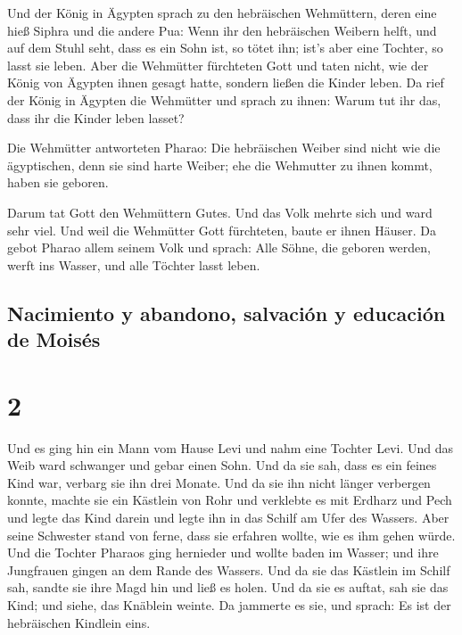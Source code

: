  Und der König in Ägypten sprach zu den hebräischen
Wehmüttern, deren eine hieß Siphra und die andere Pua: 
Wenn ihr den hebräischen Weibern helft, und auf dem Stuhl seht, dass es
ein Sohn ist, so tötet ihn; ist's aber eine Tochter, so lasst sie leben.
 Aber die Wehmütter fürchteten Gott und taten nicht, wie
der König von Ägypten ihnen gesagt hatte, sondern ließen die Kinder
leben.  Da rief der König in Ägypten die Wehmütter und
sprach zu ihnen: Warum tut ihr das, dass ihr die Kinder leben lasset?

 Die Wehmütter antworteten Pharao: Die hebräischen Weiber
sind nicht wie die ägyptischen, denn sie sind harte Weiber; ehe die
Wehmutter zu ihnen kommt, haben sie geboren.

 Darum tat Gott den Wehmüttern Gutes. Und das Volk mehrte
sich und ward sehr viel.  Und weil die Wehmütter Gott
fürchteten, baute er ihnen Häuser.  Da gebot Pharao allem
seinem Volk und sprach: Alle Söhne, die geboren werden, werft ins
Wasser, und alle Töchter lasst leben.

\hypertarget{nacimiento-y-abandono-salvaciuxf3n-y-educaciuxf3n-de-moisuxe9s}{%
\subsection{Nacimiento y abandono, salvación y educación de
Moisés}\label{nacimiento-y-abandono-salvaciuxf3n-y-educaciuxf3n-de-moisuxe9s}}

\hypertarget{section-1}{%
\section{2}\label{section-1}}

 Und es ging hin ein Mann vom Hause Levi und nahm eine
Tochter Levi.  Und das Weib ward schwanger und gebar einen
Sohn. Und da sie sah, dass es ein feines Kind war, verbarg sie ihn drei
Monate.  Und da sie ihn nicht länger verbergen konnte,
machte sie ein Kästlein von Rohr und verklebte es mit Erdharz und Pech
und legte das Kind darein und legte ihn in das Schilf am Ufer des
Wassers.  Aber seine Schwester stand von ferne, dass sie
erfahren wollte, wie es ihm gehen würde.  Und die Tochter
Pharaos ging hernieder und wollte baden im Wasser; und ihre Jungfrauen
gingen an dem Rande des Wassers. Und da sie das Kästlein im Schilf sah,
sandte sie ihre Magd hin und ließ es holen.  Und da sie es
auftat, sah sie das Kind; und siehe, das Knäblein weinte. Da jammerte es
sie, und sprach: Es ist der hebräischen Kindlein eins.

